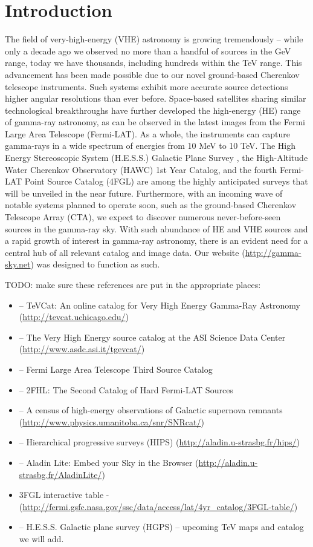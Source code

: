 \section{Introduction}

The field of very-high-energy (VHE) astronomy is growing tremendously – while only a decade ago we observed no more than a handful of sources in the GeV range, today we have thousands, including hundreds within the TeV range. This advancement has been made possible due to our novel ground-based Cherenkov telescope instruments. Such systems exhibit more accurate source detections higher angular resolutions than ever before. Space-based satellites sharing similar technological breakthroughs have further developed the high-energy (HE) range of gamma-ray astronomy, as can be observed in the latest images from the Fermi Large Area Telescope (Fermi-LAT). As a whole, the instruments can capture gamma-rays in a wide spectrum of energies from 10 MeV to 10 TeV. The High Energy Stereoscopic System (H.E.S.S.) Galactic Plane Survey \cite{hgps}, the High-Altitude Water Cherenkov Observatory (HAWC) 1st Year Catalog, and the fourth Fermi-LAT Point Source Catalog (4FGL) are among the highly anticipated surveys that will be unveiled in the near future. Furthermore, with an incoming wave of notable systems planned to operate soon, such as the ground-based Cherenkov Telescope Array (CTA), we expect to discover numerous never-before-seen sources in the gamma-ray sky. With such abundance of HE and VHE sources and a rapid growth of interest in gamma-ray astronomy, there is an evident need for a central hub of all relevant catalog and image data. Our website (\url{http://gamma-sky.net}) was designed to function as such.

TODO: make sure these references are put in the appropriate places:

\begin{itemize}
    \item \cite{tevcat} -- TeVCat: An online catalog for Very High Energy Gamma-Ray Astronomy (\url{http://tevcat.uchicago.edu/})
    \item \cite{tgevcat} -- The Very High Energy source catalog at the ASI Science Data Center (\url{http://www.asdc.asi.it/tgevcat/})
    \item \cite{3fgl} -- Fermi Large Area Telescope Third Source Catalog
    \item \cite{2fhl} -- 2FHL: The Second Catalog of Hard Fermi-LAT Sources
    \item \cite{snrcat} -- A census of high-energy observations of Galactic supernova remnants (\url{http://www.physics.umanitoba.ca/snr/SNRcat/})
    \item \cite{hips} -- Hierarchical progressive surveys (HIPS) (\url{http://aladin.u-strasbg.fr/hips/})
    \item \cite{aladin-lite} -- Aladin Lite: Embed your Sky in the Browser (\url{http://aladin.u-strasbg.fr/AladinLite/})
    \item 3FGL interactive table - (\url{http://fermi.gsfc.nasa.gov/ssc/data/access/lat/4yr_catalog/3FGL-table/})
    \item \cite{hgps} -- H.E.S.S. Galactic plane survey (HGPS) -- upcoming TeV maps and catalog we will add.
\end{itemize}
